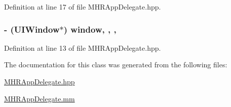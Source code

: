 Definition at line 17 of file M\+H\+R\+App\+Delegate.\+hpp.

\hypertarget{interface_m_h_r_app_delegate_ae07fbc2242a8ac6a6cca11d22a56dede}{
\subsubsection[{window}]{\setlength{\rightskip}{0pt plus 5cm}-\/ (U\+I\+Window$\ast$) window\hspace{0.3cm}{\ttfamily [read]}, {\ttfamily [write]}, {\ttfamily [nonatomic]}, {\ttfamily [strong]}}}\label{interface_m_h_r_app_delegate_ae07fbc2242a8ac6a6cca11d22a56dede}


Definition at line 13 of file M\+H\+R\+App\+Delegate.\+hpp.



The documentation for this class was generated from the following files\+:\begin{DoxyCompactItemize}
\item 
\hyperlink{_m_h_r_app_delegate_8hpp}{M\+H\+R\+App\+Delegate.\+hpp}\item 
\hyperlink{_m_h_r_app_delegate_8mm}{M\+H\+R\+App\+Delegate.\+mm}\end{DoxyCompactItemize}
